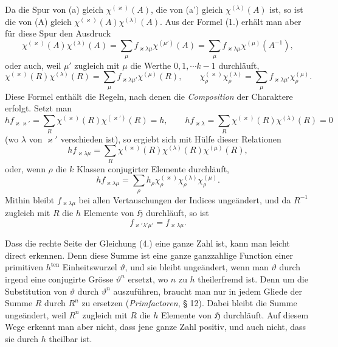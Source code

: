 \documentclass[11pt]{article}
\newcommand{\Hgr}{\mathfrak{H}}
\newcommand{\ten}{\mathrm{ten}}
\begin{document}
Da die Spur von (a) gleich $\chi^{(\varkappa)}(A)$, die von (a') gleich $\chi^{(\lambda)}(A)$ ist, so ist die von (A) gleich $\chi^{(\varkappa)}(A)\chi^{(\lambda)}(A)$. Aus der Formel (1.) erhält man aber für diese Spur den Ausdruck
\[
\chi^{(\varkappa)}(A)\chi^{(\lambda)}(A)
 =\sum_\mu f_{\varkappa\lambda\mu}\chi^{(\mu')}(A)
 =\sum_\mu f_{\varkappa\lambda\mu}\chi^{(\mu)}(A^{-1}),
\]
oder auch, weil $\mu'$ zugleich mit $\mu$ die Werthe $0,1,\cdots k-1$ durchläuft,
\begin{equation*}\tag{2.}
\chi^{(\varkappa)}(R)\chi^{(\lambda)}(R)
=\sum_\mu f_{\varkappa\lambda\mu'}\chi^{(\mu)}(R),
\qquad
\chi_\rho^{(\varkappa)}\chi_\rho^{(\lambda)}
=\sum_\mu f_{\varkappa\lambda\mu'}\chi_\rho^{(\mu)}.
\end{equation*}
Diese Formel enthält die Regeln, nach denen die \emph{Composition} der Charaktere erfolgt. Setzt man
\begin{equation*}\tag{3.}
h f_{\varkappa\varkappa'}=\sum_R \chi^{(\varkappa)}(R)\chi^{(\varkappa')}(R)=h,
\qquad
h f_{\varkappa\lambda}=\sum_R \chi^{(\varkappa)}(R)\chi^{(\lambda)}(R)=0
\end{equation*}
(wo $\lambda$ von $\varkappa'$ verschieden ist), so ergiebt sich mit Hülfe dieser Relationen
\begin{equation*}\tag{4.}
h f_{\varkappa\lambda\mu}=\sum_R \chi^{(\varkappa)}(R)\chi^{(\lambda)}(R)\chi^{(\mu)}(R),
\end{equation*}
oder, wenn $\rho$ die $k$ Klassen conjugirter Elemente durchläuft,
\begin{equation*}\tag{5.}
h f_{\varkappa\lambda\mu}
=\sum_\rho h_\rho\chi_\rho^{(\varkappa)}\chi_\rho^{(\lambda)}\chi_\rho^{(\mu)}.
\end{equation*}
Mithin bleibt $f_{\varkappa\lambda\mu}$ bei allen Vertauschungen der Indices ungeändert, und da $R^{-1}$ zugleich mit $R$ die $h$ Elemente von $\Hgr$ durchläuft, so ist
\begin{equation*}\tag{6.}
f_{\varkappa'\lambda'\mu'}=f_{\varkappa\lambda\mu}.
\end{equation*}

Dass die rechte Seite der Gleichung (4.) eine ganze Zahl ist, kann man leicht direct erkennen. Denn diese Summe ist eine ganze ganzzahlige Function einer primitiven $h^{\ten}$ Einheitswurzel $\vartheta$, und sie bleibt ungeändert, wenn man $\vartheta$ durch irgend eine conjugirte Grösse $\vartheta^n$ ersetzt, wo $n$ zu $h$ theilerfremd ist. Denn um die Substitution von $\vartheta$ durch $\vartheta^n$ auszuführen, braucht man nur in jedem Gliede der Summe $R$ durch $R^n$ zu ersetzen (\emph{Primfactoren}, § 12). Dabei bleibt die Summe ungeändert, weil $R^n$ zugleich mit $R$ die $h$ Elemente von $\Hgr$ durchläuft. Auf diesem Wege erkennt man aber nicht, dass jene ganze Zahl positiv, und auch nicht, dass sie durch $h$ theilbar ist.
\end{document}
